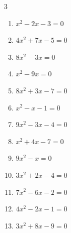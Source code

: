 \begin{multicols}{3}
\begin{enumerate}
\columnbreak %

  \item $x^{2}-2x-3=0$

        \phantom{$\displaystyle x=3, \; -1$}

  \item $4x^{2}+7x-5=0$


  \item $8x^{2}-3x=0$


  \item $x^{2}-9x=0$

        \phantom{$\displaystyle x=9, \; 0$}

  \item $8x^{2}+3x-7=0$


  \item $x^{2}-x-1=0$


  \item $9x^{2}-3x-4=0$


\columnbreak %

  \item $x^{2}+4x-7=0$


  \item $9x^{2}-x=0$


  \item $3x^{2}+2x-4=0$


  \item $7x^{2}-6x-2=0$


  \item $4x^{2}-2x-1=0$


  \item $3x^{2}+8x-9=0$


\end{enumerate}
\end{multicols}
